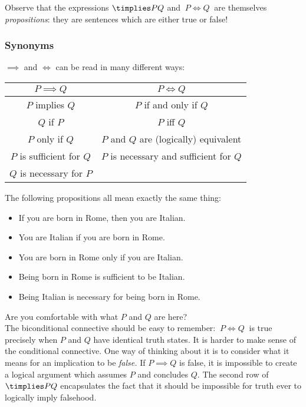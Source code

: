 \noindent Observe that the expressions $\timplies PQ$ and $\ P\iff Q\ $ are themselves \emph{propositions}: they are sentences which are either true or false!

\subsubsection*{Synonyms}

$\implies$ and $\iff$ can be read in many different ways:
\begin{center}
\begin{tabular}{c|c}
$P\implies Q$ & $P\iff Q$\\\hline
$P$ implies $Q$ & $P$ if and only if $Q$\\
$Q$ if $P$ & $P$ iff $Q$\\
$P$ only if $Q$ & $P$ and $Q$ are (logically) equivalent\\
$P$ is sufficient for $Q$ &$P$ is necessary and sufficient for $Q$\\
$Q$ is necessary for $P$ &
\end{tabular}
\end{center}

\begin{example}
The following propositions all mean exactly the same thing:
\begin{itemize}
\item If you are born in Rome, then you are Italian. 
\item You are Italian if you are born in Rome. 
\item You are born in Rome only if you are Italian. 
\item Being born in Rome is sufficient to be Italian. 
\item Being Italian is necessary for being born in Rome. 
\end{itemize}
\end{example}


\noindent Are you comfortable with what $P$ and $Q$ are here?\\

\noindent The biconditional connective should be easy to remember: $\ P\iff Q\ $ is true precisely when $P$ and $Q$ have identical truth states. It is harder to make sense of the conditional connective. One way of thinking about it is to consider what it means for an implication to be \emph{false.} If $P\implies Q$ is false, it is impossible to create a logical argument which assumes $P$ and concludes $Q$. The second row of $\timplies PQ$ encapsulates the fact that it should be impossible for truth ever to logically imply falsehood. 

